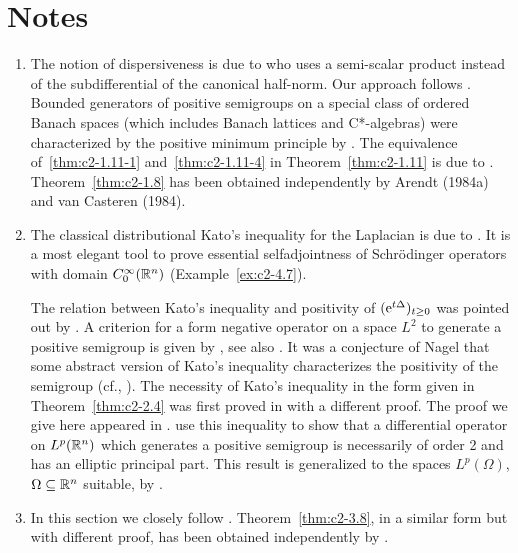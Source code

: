 \section*{Notes}
\begin{enumerate}[label=\emph{Section \arabic*:}, wide]
\item   The notion of dispersiveness is due to \textcite{phillips:1962} who uses a semi-scalar product instead of the subdifferential of the canonical half-norm.
Our approach follows \textcite{arendtchernoffkato:1982}.
Bounded generators of positive semigroups on a special class of ordered Banach spaces (which includes Banach lattices and C*-algebras) were characterized by the positive minimum principle by \textcite{evanshancheolsen:1979}.
The equivalence of~\ref{thm:c2-1.11-1} and~\ref{thm:c2-1.11-4}  in Theorem~\ref{thm:c2-1.11}  is due to \textcite{nageluhlig:1981}.
Theorem~\ref{thm:c2-1.8}   has been obtained independently by Arendt (1984a) and van Casteren (1984).

\item  
The classical distributional Kato's inequality for the Laplacian is due to \textcite{kato:1973}.
It is a most elegant tool to prove essential selfadjointness of Schrödinger operators with domain $C^{\infty}_0(\mathbb{R}^n)$ (\cf Example~\ref{ex:c2-4.7}).

The relation between Kato's inequality and positivity of\/ $(\eu^{t\Delta})_{t \geq 0}$ was pointed out by \textcite{simon:1977}.
A criterion for a form negative operator on a space $L^{2}$ to generate a positive semigroup is given by \textcite{beurlingdeny:1958}, see also \textcite[Vol. IV, Section XIII.12]{reedsimon:1978}.
It was a conjecture of Nagel that some abstract version of
Kato's inequality characterizes the positivity of the semigroup (cf., \textcite{nageluhlig:1981}). The necessity of Kato's inequality in the form given in Theorem~\ref{thm:c2-2.4}   was first proved in \textcite[Remark 3.10]{arendt:1982} with a different proof. 
The proof we give here appeared in \textcite{arendt:1984a}. 
\textcite{miyajimaokazawa:1984} use this inequality to show that a differential operator on $L^p(\mathbb{R}^n)$ which generates a positive semigroup is necessarily of order 2 and has an elliptic principal part. 
This result is generalized to the spaces $L^p(\Omega)$, $\Omega \subseteq \mathbb{R}^n$ suitable, by \textcite{miyajima:1986}.

\item  In this section we closely follow \textcite{arendt:1984a}. Theorem~\ref{thm:c2-3.8}, in a similar form but with different proof, has been obtained independently by \textcite{schep:1985}.


\end{enumerate}
